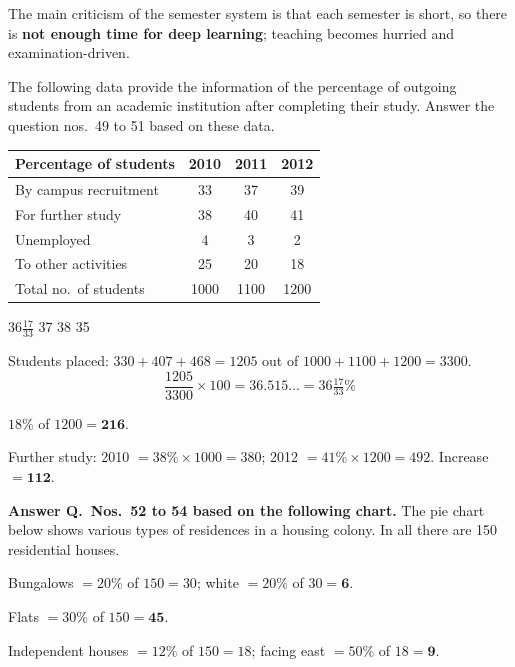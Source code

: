 The main criticism of the semester system is that each semester is short, so there is \textbf{not enough time for deep learning}; teaching becomes hurried and examination-driven.

The following data provide the information of the percentage of outgoing students from an academic institution after completing their study. Answer the question nos.~49 to 51 based on these data.
\begin{center}\small
\begin{tabular}{lccc}\toprule \textbf{Percentage of students} & \textbf{2010} & \textbf{2011} & \textbf{2012}\\\midrule
By campus recruitment & 33 & 37 & 39\\ For further study & 38 & 40 & 41\\ Unemployed & 4 & 3 & 2\\ To other activities & 25 & 20 & 18\\\midrule
Total no.\ of students & 1000 & 1100 & 1200\\\bottomrule
\end{tabular}
\end{center}

$36\frac{17}{33}$
37
38
35

Students placed: $330+407+468=1205$ out of $1000+1100+1200=3300$.
\[\frac{1205}{3300}\times100=36.515\ldots=36\tfrac{17}{33}\%\]

$18\%$ of $1200=\mathbf{216}$.

Further study: 2010 $=38\%\times1000=380$; 2012 $=41\%\times1200=492$. Increase $=\mathbf{112}$.

\textbf{Answer Q.~Nos.~52 to 54 based on the following chart.} The pie chart below shows various types of residences in a housing colony. In all there are 150 residential houses.
\begin{center}
\end{center}

Bungalows $=20\%$ of $150=30$; white $=20\%$ of $30=\mathbf{6}$.

Flats $=30\%$ of $150=\mathbf{45}$.

Independent houses $=12\%$ of $150=18$; facing east $=50\%$ of $18=\mathbf{9}$.


